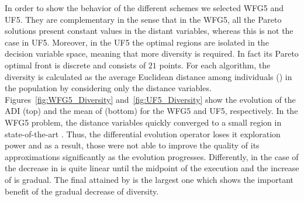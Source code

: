 In order to show the behavior of the different schemes we selected WFG5 and UF5.
%
They are complementary in the sense that in the WFG5, all the Pareto solutions present constant 
values in the distant variables, whereas this is not the case in UF5.
%
Moreover, in the UF5 the optimal regions are isolated in the decision variable 
space, meaning that more diversity is required.
%
In fact its Pareto optimal front is discrete and consists of $21$ points.
%
For each algorithm, the diversity is calculated as the average Euclidean distance among individuals (\ADI{}) in the population 
by considering only the distance variables.
%
Figures~\ref{fig:WFG5_Diversity} and~\ref{fig:UF5_Diversity} show the evolution of the ADI (top) and the mean of \HV{} (bottom) 
for the WFG5 and UF5, respectively.
%
In the WFG5 problem, the distance variables quickly converged to a small region 
in state-of-the-art \MOEAS{}.
%
Thus, the differential evolution operator loses it exploration power and as a result,
those \MOEAS{} were not able to improve the quality of its approximations significantly as the
evolution progresses.
%
Differently, in the case of \AVSDMOEAD{} the decrease in \ADI{} is quite linear until the midpoint of the execution and
the increase of \HV{} is gradual.
%
The final \HV{} attained by \AVSDMOEAD{} is the largest one which shows the important benefit
of the gradual decrease of diversity.

